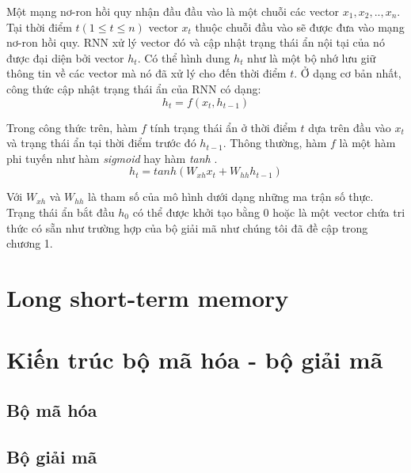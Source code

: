 

Một mạng nơ-ron hồi quy nhận đầu đầu vào là một chuỗi các vector $x_1, x_2,.., x_n$. Tại thời điểm $t (1 \le t \le n)$ vector $x_t$ thuộc chuỗi đầu vào sẽ được đưa vào mạng nơ-ron hồi quy. RNN xử lý vector đó và cập nhật trạng thái ẩn nội tại của nó được đại diện bởi vector $h_t$. Có thể hình dung $h_t$ như là một bộ nhớ lưu giữ thông tin về các vector mà nó đã xử lý cho đến thời điểm $t$. Ở dạng cơ bản nhất, công thức cập nhật trạng thái ẩn của RNN có dạng:
$$h_t = f \left(x_t, h_{t-1} \right)$$

Trong công thức trên, hàm $f$ tính trạng thái ẩn ở thời điểm $t$ dựa trên đầu vào $x_t$ và trạng thái ẩn tại thời điểm trước đó $h_{t-1}$. Thông thường, hàm $f$ là một hàm phi tuyến như hàm \textit{sigmoid} \cite{sigmoidfunction} hay hàm \textit{tanh} \cite{tanhfunction}.
$$h_t = tanh \left(W_{xh} x_t + W_{hh}h_{t-1} \right)$$

Với $W_{xh}$ và $W_{hh}$ là tham số của mô hình dưới dạng những ma trận số thực. Trạng thái ẩn bắt đầu $h_0$ có thể được khởi tạo bằng 0 hoặc là một vector chứa tri thức có sẵn như trường hợp của bộ giải mã như chúng tôi đã đề cập trong chương 1.




\section{Long short-term memory}

\section{Kiến trúc bộ mã hóa - bộ giải mã}
\subsection{Bộ mã hóa}
\subsection{Bộ giải mã}



